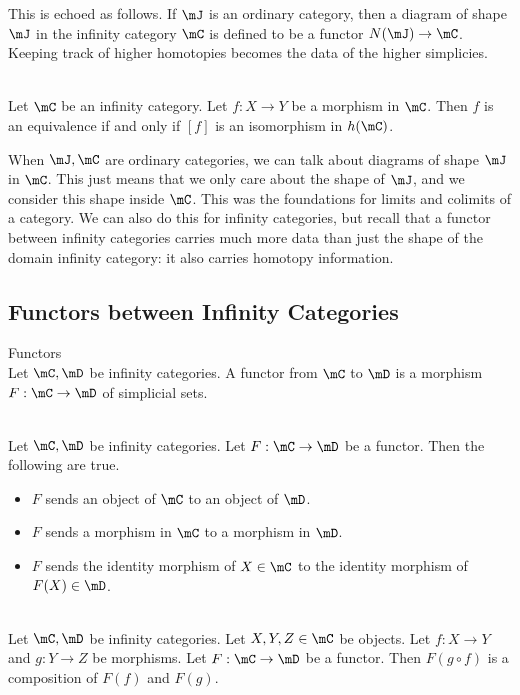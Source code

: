 \documentclass[a4paper]{article}
\begin{document}
This is echoed as follows. If $\mJ$ is an ordinary category, then a diagram of shape $\mJ$ in the infinity category $\mC$ is defined to be a functor $N(\mJ)\to\mC$. Keeping track of higher homotopies becomes the data of the higher simplicies. 

\begin{prp}{}{}\\ Let $\mC$ be an infinity category. Let $f:X\to Y$ be a morphism in $\mC$. Then $f$ is an equivalence if and only if $[f]$ is an isomorphism in $h(\mC)$. 
\end{prp}

When $\mJ,\mC$ are ordinary categories, we can talk about diagrams of shape $\mJ$ in $\mC$. This just means that we only care about the shape of $\mJ$, and we consider this shape inside $\mC$. This was the foundations for limits and colimits of a category. We can also do this for infinity categories, but recall that a functor between infinity categories carries much more data than just the shape of the domain infinity category: it also carries homotopy information. 

\subsection{Functors between Infinity Categories}
\begin{defn}{Functors}{}\\ Let $\mC,\mD$ be infinity categories. A functor from $\mC$ to $\mD$ is a morphism $F:\mC\to\mD$ of simplicial sets. 
\end{defn}

\begin{lmm}{}{}\\ Let $\mC,\mD$ be infinity categories. Let $F:\mC\to\mD$ be a functor. Then the following are true. 
\begin{itemize}
\item $F$ sends an object of $\mC$ to an object of $\mD$. 
\item $F$ sends a morphism in $\mC$ to a morphism in $\mD$. 
\item $F$ sends the identity morphism of $X\in\mC$ to the identity morphism of $F(X)\in\mD$. 
\end{itemize}
\end{lmm}

\begin{lmm}{}{}\\ Let $\mC,\mD$ be infinity categories. Let $X,Y,Z\in\mC$ be objects. Let $f:X\to Y$ and $g:Y\to Z$ be morphisms. Let $F:\mC\to\mD$ be a functor. Then $F(g\circ f)$ is a composition of $F(f)$ and $F(g)$. 
\end{lmm}
\end{document}
